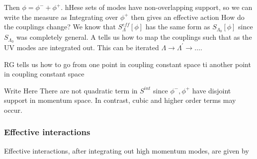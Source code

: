 \documentclass{article}
\begin{document}
Then $\phi = \phi^- + \phi^+$. hHese sets of modes have non-overlapping support, so we can write the measure as 
Integrating over $\phi^+$ then gives an effective action
How do the couplings change? We know that $S_\Lambda^{eff}[\phi]$ has the same form as $S_{\Lambda_0}[\phi]$ since $S_{\Lambda_0}$ was completely general. A  tells us how to map the couplings such that 
as the UV modes are integrated out. This can be iterated $\Lambda \to \Lambda^\prime \to \dots$. 

\begin{idea}
RG tells us how to go from one point in coupling constant space ti another point in coupling constant space
\end{idea}

Write 
\eq{
S_{\Lambda_0}p\phi^- + \phi^+] = S_0[\phi^-]+S_0[\phi^+] + S^{int}[\phi^-,\phi^+]
}
Here
There are not quadratic term in $S^{int}$ since $\phi^-,\phi^+$ have disjoint support in momentum space. In contrast, cubic and higher order terms may occur. 

\subsubsection*{Effective interactions}
Effective interactions, after integrating out high momentum modes, are given by 

\end{document}
